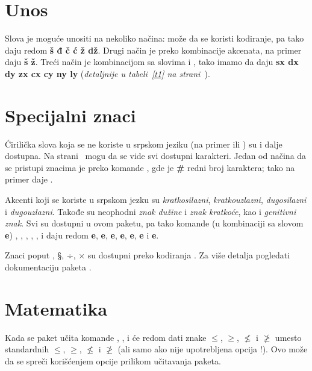 \documentclass[12pt]{article}
\begin{document}
\section{Unos}

Slova je moguće unositi na nekoliko načina: može da se koristi \textit{} kodiranje, pa tako \textbf{} daju redom \textbf{š đ č ć ž dž}.
Drugi način je preko kombinacije akcenata, na primer \textbf{} daju \textbf{\v s \dj{} \v z}.
Treći način je kombinacijom sa slovima \textbf{} i \textbf{}, tako imamo da \textbf{} daju \textbf{sx dx dy zx cx cy ny ly} (\emph{detaljnije u tabeli~\ref{t1} na strani~\pageref{t1}}).

\section{Specijalni znaci}

Ćirilička slova koja se ne koriste u srpskom jeziku (na primer  ili ) su i dalje dostupna.
Na strani~\pageref{t2} mogu da se vide svi dostupni karakteri. Jedan od načina da se pristupi znacima je preko komande \textbf{}, gde je \textbf{\#} redni broj karaktera; tako na primer \textbf{} daje .

Akcenti koji se koriste u srpskom jezku su \emph{kratkosilazni}, \emph{kratkouzlazni}, \emph{dugosilazni} i \emph{dugouzlazni}.
Takođe su neophodni \emph{znak dužine} i \emph{znak kratkoće}, kao i \emph{genitivni znak}.
Svi su dostupni u ovom paketu, pa tako komande (u kombinaciji sa slovom \textbf{e}) \textbf{}, \textbf{}, \textbf{}, \textbf{}, \textbf{}, \textbf{} i \textbf{} daju redom \textbf{\AKS e}, \textbf{\AKU e}, \textbf{\ADS e}, \textbf{\ADU e}, \textbf{\ADZ e}, \textbf{\AKZ e} i \textbf{\AGZ e}.

Znaci poput \textnumero, §, ÷, × su dostupni preko kodiranja \textit{}.
Za više detalja pogledati dokumentaciju paketa \textbf{}.

\section{Matematika}

Kada se paket učita komande \textbf{}, \textbf{}, \textbf{} i \textbf{} će redom dati znake $\leqslant$, $\geqslant$, $\nleqslant$ i $\ngeqslant$ umesto standardnih $\leq$, $\geq$, $\nleq$ i $\ngeq$ (ali samo ako nije upotrebljena opcija \textbf{}!).
Ovo može da se spreči korišćenjem opcije \textbf{} prilikom učitavanja paketa.
\end{document}
